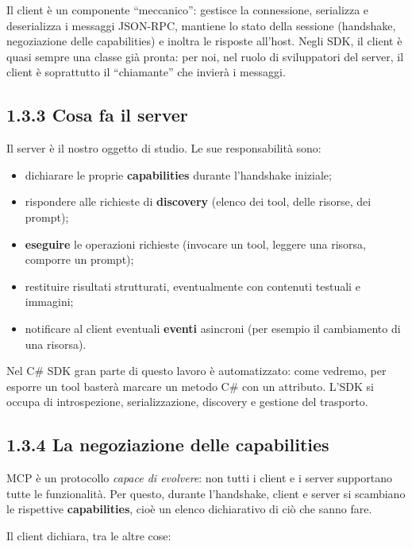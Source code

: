\documentclass[
  italian,
  10pt,
]{book}
\providecommand{\tightlist}{%
  \setlength{\itemsep}{0pt}\setlength{\parskip}{0pt}}
\begin{document}
Il client è un componente ``meccanico'': gestisce la connessione,
serializza e deserializza i messaggi JSON-RPC, mantiene lo stato della
sessione (handshake, negoziazione delle capabilities) e inoltra le
risposte all'host. Negli SDK, il client è quasi sempre una classe già
pronta: per noi, nel ruolo di sviluppatori del server, il client è
soprattutto il ``chiamante'' che invierà i messaggi.

\subsection{1.3.3 Cosa fa il server}\label{cosa-fa-il-server}

Il server è il nostro oggetto di studio. Le sue responsabilità sono:

\begin{itemize}
\tightlist
\item
  dichiarare le proprie \textbf{capabilities} durante l'handshake
  iniziale;
\item
  rispondere alle richieste di \textbf{discovery} (elenco dei tool,
  delle risorse, dei prompt);
\item
  \textbf{eseguire} le operazioni richieste (invocare un tool, leggere
  una risorsa, comporre un prompt);
\item
  restituire risultati strutturati, eventualmente con contenuti testuali
  e immagini;
\item
  notificare al client eventuali \textbf{eventi} asincroni (per esempio
  il cambiamento di una risorsa).
\end{itemize}

Nel C\# SDK gran parte di questo lavoro è automatizzato: come vedremo,
per esporre un tool basterà marcare un metodo C\# con un attributo.
L'SDK si occupa di introspezione, serializzazione, discovery e gestione
del trasporto.

\subsection{1.3.4 La negoziazione delle
capabilities}\label{la-negoziazione-delle-capabilities}

MCP è un protocollo \emph{capace di evolvere}: non tutti i client e i
server supportano tutte le funzionalità. Per questo, durante
l'handshake, client e server si scambiano le rispettive
\textbf{capabilities}, cioè un elenco dichiarativo di ciò che sanno
fare.

Il client dichiara, tra le altre cose:
\end{document}
